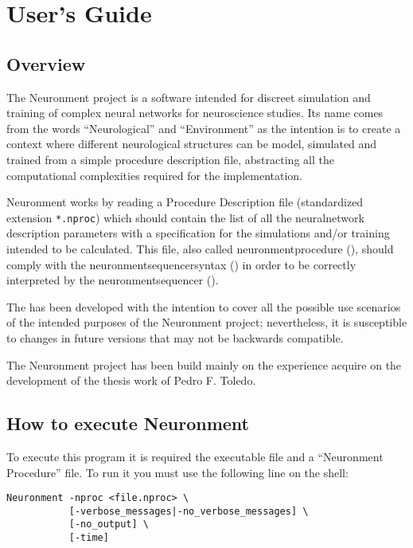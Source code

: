 \chapter{User's Guide}
\label{ch:usersguide}

\section{Overview}

The Neuronment project is a software intended for discreet simulation and training of complex neural networks for neuroscience studies. Its name comes from the words ``Neurological'' and ``Environment'' as the intention is to create a context where different neurological structures can be model, simulated and trained from a simple procedure description file, abstracting all the computational complexities required for the implementation.

Neuronment works by reading a Procedure Description file (standardized extension \texttt{*.nproc}) which should contain the list of all the \gls{neuralnetwork} description parameters with a specification for the simulations and/or training intended to be calculated. This file, also called \gls{neuronmentprocedure} (\NPROC), should comply with the \gls{neuronmentsequencersyntax} () in order to be correctly interpreted by the \gls{neuronmentsequencer} ().

The  has been developed with the intention to cover all the possible use scenarios of the intended purposes of the Neuronment project; nevertheless, it is susceptible to changes in future versions that may not be backwards compatible.

The Neuronment project has been build mainly on the experience acquire on the development of the thesis work of Pedro F. Toledo\cite{thesispedro}.

\section{How to execute Neuronment}

To execute this program it is required the executable file and a ``Neuronment Procedure'' file. To run it you must use the following line on the shell:

\begin{verbatim}
Neuronment -nproc <file.nproc> \
           [-verbose_messages|-no_verbose_messages] \
           [-no_output] \
           [-time]
\end{verbatim}

